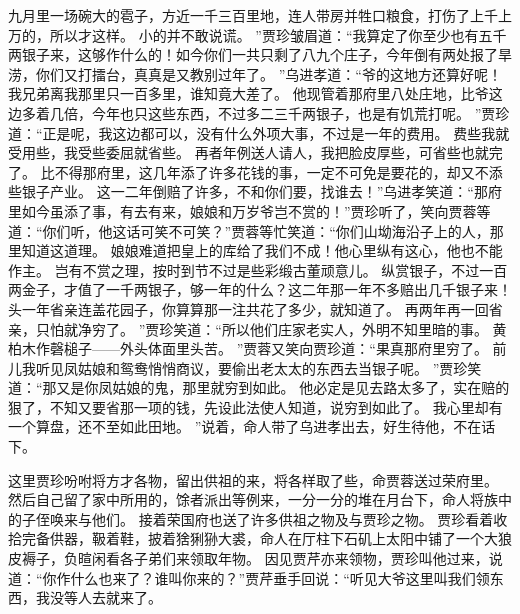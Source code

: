 九月里一场碗大的雹子，方近一千三百里地，连人带房并牲口粮食，打伤了上千上万的，所以才这样。
小的并不敢说谎。
”贾珍皱眉道：“我算定了你至少也有五千两银子来，这够作什么的！如今你们一共只剩了八九个庄子，今年倒有两处报了旱涝，你们又打擂台，真真是又教别过年了。
”乌进孝道：“爷的这地方还算好呢！我兄弟离我那里只一百多里，谁知竟大差了。
他现管着那府里八处庄地，比爷这边多着几倍，今年也只这些东西，不过多二三千两银子，也是有饥荒打呢。
”贾珍道：“正是呢，我这边都可以，没有什么外项大事，不过是一年的费用。
费些我就受用些，我受些委屈就省些。
再者年例送人请人，我把脸皮厚些，可省些也就完了。
比不得那府里，这几年添了许多花钱的事，一定不可免是要花的，却又不添些银子产业。
这一二年倒赔了许多，不和你们要，找谁去！”乌进孝笑道：“那府里如今虽添了事，有去有来，娘娘和万岁爷岂不赏的！”贾珍听了，笑向贾蓉等道：“你们听，他这话可笑不可笑？”贾蓉等忙笑道：“你们山坳海沿子上的人，那里知道这道理。
娘娘难道把皇上的库给了我们不成！他心里纵有这心，他也不能作主。
岂有不赏之理，按时到节不过是些彩缎古董顽意儿。
纵赏银子，不过一百两金子，才值了一千两银子，够一年的什么？这二年那一年不多赔出几千银子来！头一年省亲连盖花园子，你算算那一注共花了多少，就知道了。
再两年再一回省亲，只怕就净穷了。
”贾珍笑道：“所以他们庄家老实人，外明不知里暗的事。
黄柏木作磬槌子——外头体面里头苦。
”贾蓉又笑向贾珍道：“果真那府里穷了。
前儿我听见凤姑娘和鸳鸯悄悄商议，要偷出老太太的东西去当银子呢。
”贾珍笑道：“那又是你凤姑娘的鬼，那里就穷到如此。
他必定是见去路太多了，实在赔的狠了，不知又要省那一项的钱，先设此法使人知道，说穷到如此了。
我心里却有一个算盘，还不至如此田地。
”说着，命人带了乌进孝出去，好生待他，不在话下。
\par
这里贾珍吩咐将方才各物，留出供祖的来，将各样取了些，命贾蓉送过荣府里。
然后自己留了家中所用的，馀者派出等例来，一分一分的堆在月台下，命人将族中的子侄唤来与他们。
接着荣国府也送了许多供祖之物及与贾珍之物。
贾珍看着收拾完备供器，靸着鞋，披着猞猁狲大裘，命人在厅柱下石矶上太阳中铺了一个大狼皮褥子，负暄闲看各子弟们来领取年物。
因见贾芹亦来领物，贾珍叫他过来，说道：“你作什么也来了？谁叫你来的？”贾芹垂手回说：“听见大爷这里叫我们领东西，我没等人去就来了。
